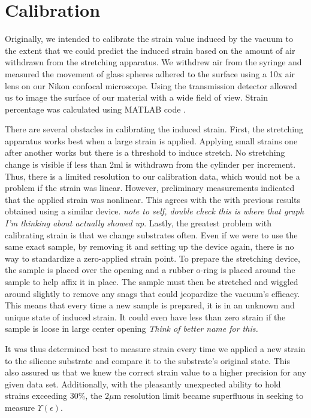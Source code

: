 \section{Calibration}
Originally, we intended to calibrate the strain value induced by the vacuum to the extent that we could predict the induced strain based on the amount of air withdrawn from the stretching apparatus. We withdrew air from the syringe and measured the movement of glass spheres adhered to the surface using a 10x air lens on our Nikon confocal microscope. Using the transmission detector allowed us to image the surface of our material with a wide field of view. Strain percentage was calculated using MATLAB code \cite{xu2017direct} .

There are several obstacles in calibrating the induced strain. First, the stretching apparatus works best when a large strain is applied. Applying small strains one after another works but there is a threshold to induce stretch. No stretching change is visible if less than 2ml is withdrawn from the cylinder per increment. Thus, there is a limited resolution to our calibration data, which would not be a problem if the strain was linear. However, preliminary measurements indicated that the applied strain was nonlinear. This agrees with the with previous results \cite{na2008time} obtained using a similar device. \emph{note to self, double check this is where that graph I'm thinking about actually showed up}. Lastly, the greatest problem with calibrating strain is that we change substrates often. Even if we were to use the same exact sample, by removing it and setting up the device again, there is no way to standardize a zero-applied strain point. To prepare the stretching device, the sample is placed over the opening and a rubber o-ring is placed around the sample to help affix it in place. The sample must then be stretched and wiggled around slightly to remove any snags that could jeopardize the vacuum's efficacy. This means that every time a new sample is prepared, it is in an unknown and unique state of induced strain. It could even have less than zero strain if the sample is loose in large center opening \emph{Think of better name for this.} 

It was thus determined best to measure strain every time we applied a new strain to the silicone substrate and compare it to the substrate's original state. This also assured us that we knew the correct strain value to a higher precision for any given data set. Additionally, with the pleasantly unexpected ability to hold strains exceeding 30\%, the $2\mu$m resolution  limit became superfluous in seeking to measure $\Upsilon(\epsilon)$.


